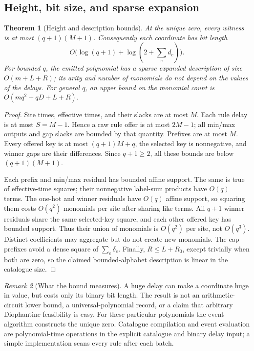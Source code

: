 \documentclass[11pt,letterpaper]{article}
\newtheorem{theorem}{Theorem}[section]
\theoremstyle{definition}
\theoremstyle{remark}
\newtheorem{remark}[theorem]{Remark}
\begin{document}
\subsection{Height, bit size, and sparse expansion}
\begin{theorem}[Height and description bounds]\label{qoc:ts:thm:height}
At the unique zero, every witness is at most $(q+1)(M+1)$. Consequently
each coordinate has bit length
\[
 O\bigl(\log(q+1)+\log(2+\textstyle\sum_e d_e)\bigr).
\]
For bounded $q$, the emitted polynomial has a sparse expanded description
of size $O(m+L+R)$; its arity and number of monomials do not depend on the
values of the delays. For general $q$, an upper bound on the monomial
count is $O(mq^2+qD+L+R)$.
\end{theorem}
\begin{proof}
Site times, effective times, and their slacks are at most $M$. Each rule
delay is at most $S=M-1$. Hence a raw rule offer is at most $2M-1$;
all min/max outputs and gap slacks are bounded by that quantity. Prefixes
are at most $M$. Every offered key is at most $(q+1)M+q$, the selected
key is nonnegative, and winner gaps are their differences. Since
$q+1\ge2$, all these bounds are below $(q+1)(M+1)$.

Each prefix and min/max residual has bounded affine support. The same is
true of effective-time squares; their nonnegative label-sum products have
$O(q)$ terms. The one-hot and winner residuals have $O(q)$ affine support,
so squaring them costs $O(q^2)$ monomials per site after sharing like terms.
All $q+1$ winner residuals share the same selected-key square, and each
other offered key has bounded support. Thus their union of monomials is
$O(q^2)$ per site, not $O(q^3)$. Distinct coefficients may aggregate but
do not create new monomials. The cap prefixes avoid a dense square of
$\sum_e\delta_e$. Finally, $R\le L+R_0$, except trivially when both are
zero, so the claimed bounded-alphabet description is linear in the
catalogue size.
\end{proof}

\begin{remark}[What the bound measures]
A huge delay can make a coordinate huge in value, but costs only its
binary bit length. The result is not an arithmetic-circuit lower bound,
a universal-polynomial record, or a claim that arbitrary Diophantine
feasibility is easy. For these particular polynomials the event algorithm
constructs the unique zero. Catalogue compilation and event evaluation are
polynomial-time operations in the explicit catalogue and binary delay
input; a simple implementation scans every rule after each batch.
\end{remark}
\end{document}
